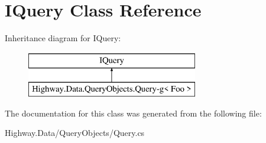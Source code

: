 \hypertarget{class_i_query-g}{\section{I\-Query Class Reference}
\label{class_i_query-g}
}
Inheritance diagram for I\-Query\-:\begin{figure}[H]
\begin{center}
\leavevmode
\includegraphics[height=2.000000cm]{class_i_query-g}
\end{center}
\end{figure}


The documentation for this class was generated from the following file\-:\begin{DoxyCompactItemize}
\item 
Highway.\-Data/\-Query\-Objects/Query.\-cs\end{DoxyCompactItemize}
